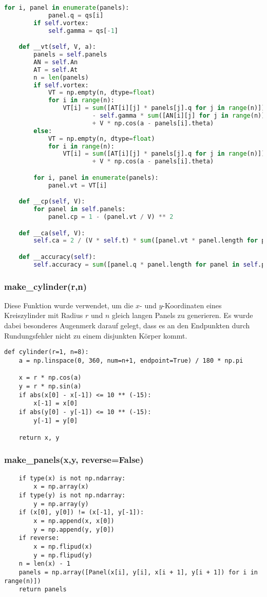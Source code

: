 \begin{lstlisting}[language=Python]
        for i, panel in enumerate(panels):
            panel.q = qs[i]
        if self.vortex:
            self.gamma = qs[-1]

    def __vt(self, V, a):
        panels = self.panels
        AN = self.An
        AT = self.At
        n = len(panels)
        if self.vortex:
            VT = np.empty(n, dtype=float)
            for i in range(n):
                VT[i] = sum([AT[i][j] * panels[j].q for j in range(n)]) \
                        - self.gamma * sum([AN[i][j] for j in range(n)]) \
                        + V * np.cos(a - panels[i].theta)
        else:
            VT = np.empty(n, dtype=float)
            for i in range(n):
                VT[i] = sum([AT[i][j] * panels[j].q for j in range(n)]) \
                        + V * np.cos(a - panels[i].theta)

        for i, panel in enumerate(panels):
            panel.vt = VT[i]

    def __cp(self, V):
        for panel in self.panels:
            panel.cp = 1 - (panel.vt / V) ** 2

    def __ca(self, V):
        self.ca = 2 / (V * self.t) * sum([panel.vt * panel.length for panel in self.panels])

    def __accuracy(self):
        self.accuracy = sum([panel.q * panel.length for panel in self.panels])


\end{lstlisting}

\subsubsection{make\_cylinder(r,n)}
Diese Funktion wurde verwendet, um die $x$- und $y$-Koordinaten eines Kreiszylinder mit Radius $r$ und $n$ gleich langen Panels zu generieren. Es wurde dabei besonderes Augenmerk darauf gelegt, dass es an den Endpunkten durch Rundungsfehler nicht zu einem disjunkten Körper kommt.
\begin{lstlisting}
def cylinder(r=1, n=8):
    a = np.linspace(0, 360, num=n+1, endpoint=True) / 180 * np.pi

    x = r * np.cos(a)
    y = r * np.sin(a)
    if abs(x[0] - x[-1]) <= 10 ** (-15):
        x[-1] = x[0]
    if abs(y[0] - y[-1]) <= 10 ** (-15):
        y[-1] = y[0]

    return x, y
\end{lstlisting}

\subsubsection{make\_panels(x,y, reverse=False)}
\begin{lstlisting}
    if type(x) is not np.ndarray:
        x = np.array(x)
    if type(y) is not np.ndarray:
        y = np.array(y)
    if (x[0], y[0]) != (x[-1], y[-1]):
        x = np.append(x, x[0])
        y = np.append(y, y[0])
    if reverse:
        x = np.flipud(x)
        y = np.flipud(y)
    n = len(x) - 1
    panels = np.array([Panel(x[i], y[i], x[i + 1], y[i + 1]) for i in range(n)])
    return panels
\end{lstlisting}


